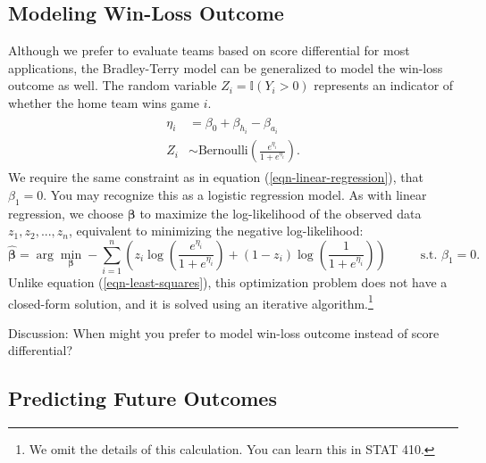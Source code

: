 \documentclass{article}
\begin{document}
  \subsection{\sc Modeling Win-Loss Outcome}

  Although we prefer to evaluate teams based on score differential for most applications, the Bradley-Terry model can be generalized to model the win-loss outcome as well. The random variable $Z_i = \mathbb{I}(Y_i > 0)$ represents an indicator of whether the home team wins game $i$.
  \begin{align}
    \label{eqn-logistic-regression}
    \begin{split}
      \eta_i &= \beta_0 + \beta_{h_i} - \beta_{a_i}\\
      Z_i &\sim \mbox{Bernoulli}\left(\frac{e^{\eta_i}}{1 + e^{\eta_i}}\right).
    \end{split}
  \end{align}
  We require the same constraint as in equation (\ref{eqn-linear-regression}), that $\beta_1 = 0$. You may recognize this as a logistic regression model. As with linear regression, we choose $\boldsymbol{\beta}$ to maximize the log-likelihood of the observed data $z_1, z_2, ..., z_n$, equivalent to minimizing the negative log-likelihood:
  \begin{equation*}
    \boldsymbol{\hat\beta} = \arg\min_{\boldsymbol{\beta}} -\sum_{i=1}^n \left(z_i \log\left(\frac{e^{\eta_i}}{1 + e^{\eta_i}}\right) + (1 - z_i) \log\left(\frac{1}{1 + e^{\eta_i}}\right)\right) \hspace{1cm} \mbox{ s.t. } \beta_1 = 0.
  \end{equation*}
  Unlike equation (\ref{eqn-least-squares}), this optimization problem does not have a closed-form solution, and it is solved using an iterative algorithm.\footnote{We omit the details of this calculation. You can learn this in STAT 410.}

  \begin{framed}
    {\sc Discussion:} When might you prefer to model win-loss outcome instead of score differential?
  \end{framed}

  \subsection{\sc Predicting Future Outcomes}
\end{document}
